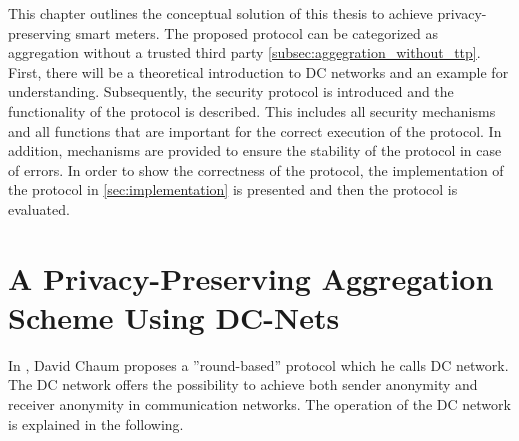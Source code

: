 
This chapter outlines the conceptual solution of this thesis to achieve privacy-preserving smart meters. The proposed protocol can be categorized as aggregation without a trusted third party \ref{subsec:aggegration_without_ttp}. First, there will be a theoretical introduction to DC networks and an example for understanding. Subsequently, the security protocol is introduced and the functionality of the protocol is described. This includes all security mechanisms and all functions that are important for the correct execution of the protocol. In addition, mechanisms are provided to ensure the stability of the protocol in case of errors. In order to show the correctness of the protocol, the implementation of the protocol in \ref{sec:implementation} is presented and then the protocol is evaluated.

\section{A Privacy-Preserving Aggregation Scheme Using DC-Nets}
In \cite{chaum1988dining}, David Chaum proposes a ''round-based'' protocol which he calls DC network. The DC network offers the possibility to achieve both sender anonymity and receiver anonymity in communication networks. The operation of the DC network is explained in the following.
